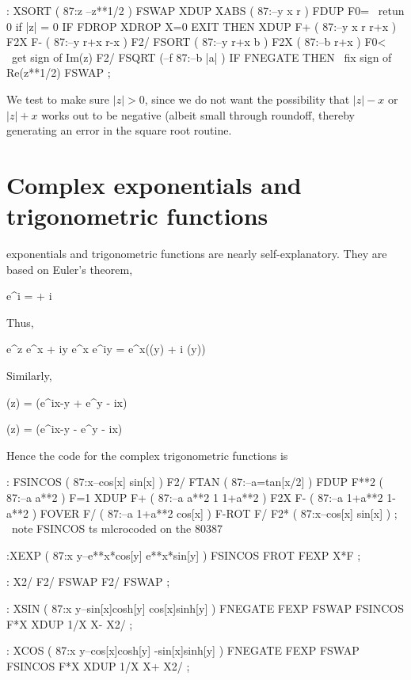 : XSORT                 ( 87:z --z**1/2 )
    FSWAP XDUP XABS     ( 87:--y x r )
    FDUP F0=            \ retun 0 if |z| = 0
    IF FDROP XDROP X=0 EXIT THEN
    XDUP F+             ( 87:--y x r r+x )
    F2X  F-             ( 87:--y r+x r-x )
    F2/  FSORT          ( 87:--y r+x b )
    F2X                 ( 87:--b r+x )
    F0<                 \ get sign of Im(z)
    F2/  FSQRT          (--f 87:--b |a| )
    IF FNEGATE THEN \ fix sign of Re(z**1/2)
    FSWAP ;

We test to make sure $\lvert z \rvert > 0$, since we do not want the possibility that $\lvert z \rvert - x$ or $\lvert z \rvert + x$ works out to be negative (albeit small through roundoff, thereby generating an error in the square root routine.

\section{Complex exponentials and trigonometric functions}
 exponentials and trigonometric functions are nearly self-explanatory. They are based on Euler’s theorem,

e^{i\theta} = \cos\theta + i \sin\theta

Thus,

e^z \equiv e^{x + iy} \equiv e^x e^{iy} = e^x(\cos(y) + i \sin(y))

Similarly,

\cos(z) = (e^{ix-y} + e^{y - ix})

\sin(z) = (e^{ix-y} - e^{y - ix})

Hence the code for the complex trigonometric functions is

\begin{listing}
: FSINCOS        ( 87:x--cos[x] sin[x] )
    F2/  FTAN    ( 87:--a=tan[x/2] )
    FDUP F**2    ( 87:--a a**2 )
    F=1 XDUP F+  ( 87:--a a**2 1 1+a**2 )
    F2X F-       ( 87:--a 1+a**2 1-a**2 )
    FOVER F/     ( 87:--a 1+a**2 cos[x] )
    F-ROT F/ F2* ( 87:x--cos[x] sin[x] )
; \ note FSINCOS ts mlcrocoded on the 80387

:XEXP    ( 87:x y--e**x*cos[y] e**x*sin[y] )
    FSINCOS FROT FEXP X*F ;

: X2/ F2/ FSWAP F2/ FSWAP ;

: XSIN   ( 87:x y--sin[x]cosh[y] cos[x]sinh[y] )
    FNEGATE FEXP FSWAP FSINCOS F*X
    XDUP 1/X X- X2/ ;

: XCOS   ( 87:x y--cos[x]cosh[y] -sin[x]sinh[y] )
    FNEGATE FEXP FSWAP FSINCOS F*X
    XDUP 1/X X+ X2/ ;
\end{listing}

